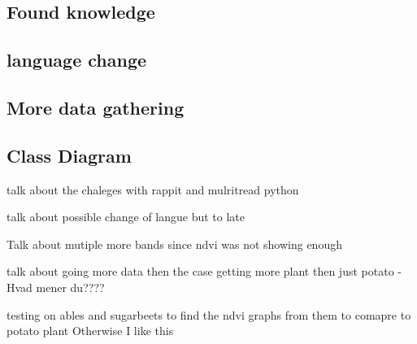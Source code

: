 \subsection{Found knowledge}

\subsection{language change}

\subsection{More data gathering}

\subsection{Class Diagram}

talk about the chaleges with rappit and mulritread python

talk about possible change of langue but to late

Talk about mutiple more bands since ndvi was not showing enough

talk about going more data then the case getting more plant then just potato - Hvad mener du????

testing on ables and sugarbeets to find the ndvi graphs from them to comapre to potato plant
Otherwise I like this


